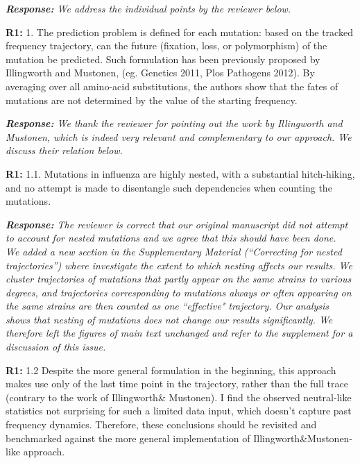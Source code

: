 \documentclass[aps,rmp,onecolumn]{revtex4-1}
\newcommand{\refa}[1]{\textbf{R1:} #1\vskip 5mm}
\newcommand{\response}[1]{{\it {\color{response}\textbf{Response:} #1}}\vskip 5mm}
\begin{document}
\response{We address the individual points by the reviewer below.}

\refa{1. The prediction problem is defined for each mutation: based on the
tracked frequency trajectory, can the future (fixation, loss, or
polymorphism) of the mutation be predicted. Such formulation has been
previously proposed by Illingworth and Mustonen, (eg. Genetics 2011,
Plos Pathogens 2012). By averaging over all amino-acid substitutions,
the authors show that the fates of mutations are not determined by the
value of the starting frequency.}

\response{We thank the reviewer for pointing out the work by Illingworth and Mustonen, which is indeed very relevant and complementary to our approach.
We discuss their relation below. }


\refa{1.1. Mutations in influenza are highly nested, with a substantial
hitch-hiking, and no attempt is made to disentangle such dependencies when counting the mutations.}

\response{
The reviewer is correct that our original manuscript did not attempt to account for nested mutations and we agree that this should have been done. \\
We added a new section in the Supplementary Material (``Correcting for nested trajectories'') where investigate the extent to which nesting affects our results.
We cluster trajectories of mutations that partly appear on the same strains to various degrees, and trajectories corresponding to mutations always or often appearing on the same strains are then counted as one ``effective" trajectory.
Our analysis shows that nesting of mutations does not change our results significantly.
We therefore left the figures of main text unchanged and refer to the supplement for a discussion of this issue.
}

\refa{1.2 Despite the more general formulation in the beginning, this
approach makes use only of the last time point in the trajectory,
rather than the full trace (contrary to the work of Illingworth\&
Mustonen). I find the observed neutral-like statistics not surprising
for such a limited data input, which doesn't capture past frequency dynamics. Therefore, these conclusions should be
revisited and benchmarked against the more general implementation of Illingworth\&Mustonen-like approach.}
\end{document}
